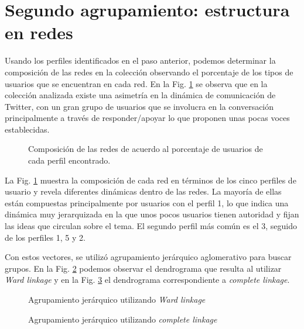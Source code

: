 \section{Segundo agrupamiento: estructura en redes}
\label{sec:experiments:clustering}

Usando los perfiles identificados en el paso anterior, podemos determinar la composición de las redes en la colección observando el porcentaje de los tipos de usuarios que se encuentran en cada red. En la Fig. \ref{fig:composition} se observa que en la colección analizada existe una asimetría en la dinámica de comunicación de Twitter, con un gran grupo de usuarios que se involucra en la conversación principalmente a través de responder/apoyar lo que proponen unas pocas voces establecidas.  

 \begin{figure}[htbp]
   \centering
   
    \caption{Composición de las redes de acuerdo al porcentaje de usuarios de cada perfil encontrado.}
    \label{fig:composition}
\end{figure}

La Fig. \ref{fig:composition} muestra la composición de cada red en términos de los cinco perfiles de usuario y revela diferentes dinámicas dentro de las redes. La mayoría de ellas están compuestas principalmente por usuarios con el perfil 1, lo que indica una dinámica muy jerarquizada en la que unos pocos usuarios tienen autoridad y fijan las ideas que circulan sobre el tema. El segundo perfil más común es el 3, seguido de los perfiles 1, 5 y 2.

Con estos vectores, se utilizó agrupamiento jerárquico aglomerativo para buscar grupos. En la Fig. \ref{fig:dendro-ward} podemos observar el dendrograma que resulta al utilizar \textit{Ward linkage} y en la Fig. \ref{fig:dendro-complete} el dendrograma correspondiente a \textit{complete linkage}.

 \begin{figure}[htbp]
   \centering
   
    \caption{Agrupamiento jerárquico utilizando \textit{Ward linkage}}
    \label{fig:dendro-ward}
\end{figure}

\newpage

 \begin{figure}[htbp]
   \centering
   
    \caption{Agrupamiento jerárquico utilizando \textit{complete linkage}}
    \label{fig:dendro-complete}
\end{figure}

